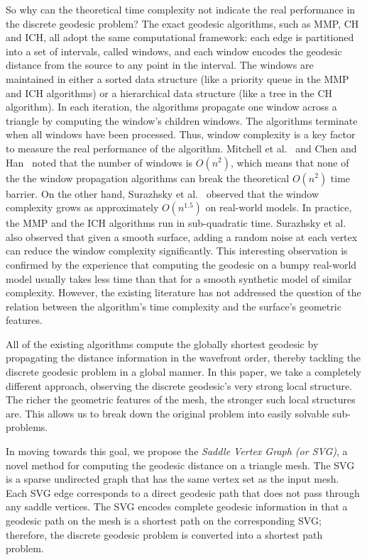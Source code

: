 So why can the theoretical time complexity not indicate the real
performance in the discrete geodesic problem? The exact geodesic
algorithms, such as MMP, CH and ICH, all adopt the same
computational framework: each edge is partitioned into a set of
intervals, called windows, and each window encodes the geodesic
distance from the source to any point in the interval. The windows
are maintained in either a sorted data structure (like a priority
queue in the MMP and ICH algorithms) or a hierarchical data
structure (like a tree in the CH algorithm). In each iteration, the
algorithms propagate one window across a triangle by computing the
window's children windows. The algorithms terminate when all windows
have been processed. Thus, window complexity is a key factor to
measure the real performance of the algorithm. Mitchell et
al.~\cite{Mitchell_Etc:1987} and Chen and
Han~\cite{Chen_Han:1990} noted that the number of windows is
$O(n^2)$, which means that none of the the window propagation
algorithms can break the theoretical $O(n^2)$ time barrier. On the
other hand, Surazhsky et al.~\cite{Surazhsky_Etc:2005} observed
that the window complexity grows as approximately $O(n^{1.5})$ on
real-world models. In practice, the MMP and the ICH algorithms run
in sub-quadratic time. Surazhsky et
al.~\cite{Surazhsky_Etc:2005} also observed that given a smooth
surface, adding a random noise at each vertex can
 reduce the window complexity significantly. This interesting observation is
confirmed by the experience that computing the geodesic on a bumpy
real-world model usually takes less time than that for a smooth
synthetic model of similar complexity. However, the existing
literature has not addressed the question of the relation between
the algorithm's time complexity and the surface's geometric
features.

All of the existing algorithms compute the globally shortest
geodesic by propagating the distance information in the wavefront
order, thereby tackling the discrete geodesic problem in a global
manner. In this paper, we take a completely different approach,
observing the discrete geodesic's very strong local structure. The
richer the geometric features of the mesh, the stronger such local
structures are. This allows us to break down the original problem
into easily solvable sub-problems.

In moving towards this goal, we propose the \textit{Saddle Vertex
Graph (or SVG)}, a novel method for computing the geodesic distance
on a triangle mesh. The SVG is a sparse undirected graph that has
the same vertex set as the input mesh. Each SVG edge corresponds to
a direct geodesic path that does not pass through any saddle
vertices. The SVG encodes complete geodesic information in that a
geodesic path on the mesh is a shortest path on the corresponding
SVG; therefore, the discrete geodesic problem is converted into a
shortest path problem.

